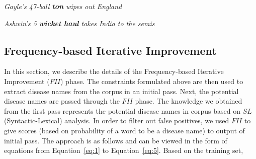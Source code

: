 \documentclass{article}
\begin{document}
\textit{Gayle's 47-ball \textbf{ton} wipes out England }

\textit{Ashwin's 5 \textbf{wicket haul} takes India to the semis}


\subsection{Frequency-based Iterative Improvement}

In this section, we describe the details of the Frequency-based Iterative Improvement ($FII$) phase. 
The constraints formulated above are then used to extract disease names from the corpus in an initial pass. Next, the potential disease names are passed through the $FII$ phase.
The knowledge we obtained from the first pass represents the potential disease names in corpus based on $SL$(Syntactic-Lexical) analysis. In order to filter out false positives, we used $FII$ to give scores (based on probability of a word to be a disease name) to output of initial pass.
The approach is as follows and can be viewed in the form of equations from Equation~\ref{eq:1} to Equation~\ref{eq:5}.
Based on the training set, 
\end{document}
